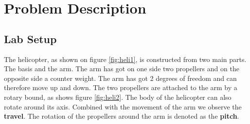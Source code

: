 \section{Problem Description}\label{sec:prob_descr}
\subsection{Lab Setup}

The helicopter, as shown on figure \ref{fig:heli1}, is constructed from two main parts. The basis and the arm. The arm has got on one side two propellers and on the opposite side a counter weight. The arm has got 2 degrees of freedom and can therefore move up and down. The two propellers are attached to the arm by a rotary bound, as shows figure \ref{fig:heli2}. 
The body of the helicopter can also rotate around its axis. Combined with the movement of the arm we observe the \textbf{travel}. The rotation of the propellers around the arm is denoted as the \textbf{pitch}. 	

